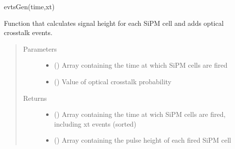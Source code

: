 \documentclass[letterpaper,10pt,english]{sphinxmanual}
\begin{document}
\begin{fulllineitems}
\label{\detokenize{structure:libs.lib.SiPMEventAction}}
evtsGen(time,xt)

Function that calculates signal height for each SiPM cell and adds optical crosstalk events.
\begin{quote}\begin{description}
\item[{Parameters}] \leavevmode\begin{itemize}
\item {} 
 () \textendash{} Array containing the time at which SiPM cells are fired

\item {} 
 () \textendash{} Value of optical crosstalk probability

\end{itemize}

\item[{Returns}] \leavevmode
\begin{itemize}
\item {} 
 () \textendash{} Array containing the time at wich SiPM cells are fired, including xt events (sorted)

\item {} 
 () \textendash{} Array containing the pulse height of each fired SiPM cell

\end{itemize}


\end{description}\end{quote}

\end{fulllineitems}

\end{document}
